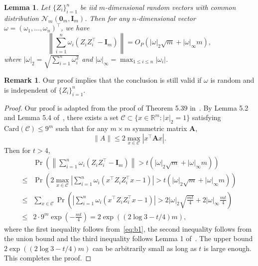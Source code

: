 \documentclass[10pt]{book}
\newtheorem{lemma}{Lemma}
\theoremstyle{definition}
\newtheorem{remark}{Remark}
\newcommand{\bA}{\mathbf{A}}
\newcommand{\bI}{\mathbf{I}}
\begin{document}
\begin{lemma}\label{lemma:con}
    Let $\{Z_i\}_{i=1}^n$ be iid $m$-dimensional random vectors with common distribution $\mathcal{N}_m(\mathbf{0}_m,\bI_m)$.
    Then for any $n$-dimensional vector $\omega=(\omega_1,\ldots,\omega_n)^\top$, we have
\begin{equation*}
    \left\|\sum_{i=1}^n \omega_i(Z_i Z_i^\top - \bI_m)\right\|=O_P(|\omega|_2 \sqrt{m}+|\omega|_{\infty}m),
\end{equation*}
where $|\omega|_2=\sqrt{\sum_{i=1}^n \omega_i^2}$ and $|\omega|_{\infty}=\max_{1\leq i\leq n}|\omega_i|$.
\end{lemma}
\begin{remark}
    Our proof implies that the conclusion is still valid if $\omega$ is random and is independent of $\{Z_i\}_{i=1}^n$.
\end{remark}
\begin{proof}
    Our proof is adapted from the proof of Theorem 5.39 in~\cite{Vershynin2010Introduction}.
    By Lemma 5.2 and Lemma 5.4 of~\cite{Vershynin2010Introduction}, there exists a set $\mathcal{C}\subset \{x\in\mathbb{R}^m: |x|_2=1\}$ satisfying $\text{Card} (\mathcal{C})\leq 9^m$ such that for any $m\times m$ symmetric matrix $\bA$,
    \begin{equation}\label{eq:b1}
    \|A\|\leq 2\max_{x\in\mathcal{C}} \left| x^\top \bA x \right|.
\end{equation}
Then for $t>4$, 
\begin{equation*}
    \begin{split}
        &\Pr\left(
            \left\|\sum_{i=1}^n \omega_i(Z_i Z_i^\top - \bI_m)\right\|
            > t (|\omega|_2 \sqrt{m}+|\omega|_{\infty} m)
        \right)
        \\
        \leq &
        \Pr\left(
            2\max_{x\in\mathcal{C}}\left|\sum_{i=1}^n \omega_i(x^\top Z_i Z_i^\top x - 1)\right|
            > t (|\omega|_2 \sqrt{m}+|\omega|_{\infty} m)
        \right)
        \\
        \leq &
        \sum_{x\in\mathcal{C}}
        \Pr\left(
            \left|\sum_{i=1}^n \omega_i(x^\top Z_i Z_i^\top x - 1)\right|
            >  2 |\omega|_2 \sqrt{\frac{mt}{4}}+2|\omega|_{\infty} \frac{mt}{4}
        \right)
        \\
        \leq & 2\cdot 9^{m} \exp\left(-\frac{mt}{4}\right)
        =2\exp\left((2\log 3 -t/4)m\right)
        ,
    \end{split}
\end{equation*}
where the first inequality follows from~\eqref{eq:b1}, the second inequality follows from the union bound and the third inequality follows Lemma 1 of~\cite{Laurent2000Adaptive}.
The upper bound $2\exp\left((2\log 3 -t/4)m\right)$ can be arbitrarily small as long as $t$ is large enough.
This completes the proof.
\end{proof}
\end{document}
